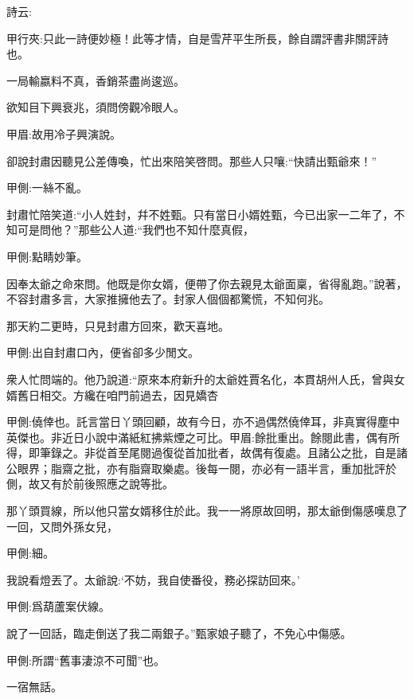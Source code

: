 \begin{parag}
    詩云:\begin{note}甲行夾:只此一詩便妙極！此等才情，自是雪芹平生所長，餘自謂評書非關評詩也。\end{note}
\end{parag}


\begin{poem}
    \begin{pl}一局輸嬴料不真，香銷茶盡尚逡巡。\end{pl}

    \begin{pl}欲知目下興衰兆，須問傍觀冷眼人。\end{pl}\begin{note}甲眉:故用冷子興演說。\end{note}
\end{poem}


\begin{parag}
    卻說封肅因聽見公差傳喚，忙出來陪笑啓問。那些人只嚷:“快請出甄爺來！”\begin{note}甲側:一絲不亂。\end{note}封肅忙陪笑道:“小人姓封，幷不姓甄。只有當日小婿姓甄，今已出家一二年了，不知可是問他？”那些公人道:“我們也不知什麼真假，\begin{note}甲側:點睛妙筆。\end{note}因奉太爺之命來問。他既是你女婿，便帶了你去親見太爺面稟，省得亂跑。”說著，不容封肅多言，大家推擁他去了。封家人個個都驚慌，不知何兆。
\end{parag}


\begin{parag}
    那天約二更時，只見封肅方回來，歡天喜地。\begin{note}甲側:出自封肅口內，便省卻多少閒文。\end{note}衆人忙問端的。他乃說道:“原來本府新升的太爺姓賈名化，本貫胡州人氏，曾與女婿舊日相交。方纔在咱門前過去，因見嬌杏\begin{note}甲側:僥倖也。託言當日丫頭回顧，故有今日，亦不過偶然僥倖耳，非真實得塵中英傑也。非近日小說中滿紙紅拂紫煙之可比。甲眉:餘批重出。餘閱此書，偶有所得，即筆錄之。非從首至尾閱過復從首加批者，故偶有復處。且諸公之批，自是諸公眼界；脂齋之批，亦有脂齋取樂處。後每一閱，亦必有一語半言，重加批評於側，故又有於前後照應之說等批。\end{note}那丫頭買線，所以他只當女婿移住於此。我一一將原故回明，那太爺倒傷感嘆息了一回，又問外孫女兒，\begin{note}甲側:細。\end{note}我說看燈丟了。太爺說:‘不妨，我自使番役，務必探訪回來。’\begin{note}甲側:爲葫蘆案伏線。\end{note}說了一回話，臨走倒送了我二兩銀子。”甄家娘子聽了，不免心中傷感。\begin{note}甲側:所謂“舊事淒涼不可聞”也。\end{note}一宿無話。
\end{parag}



